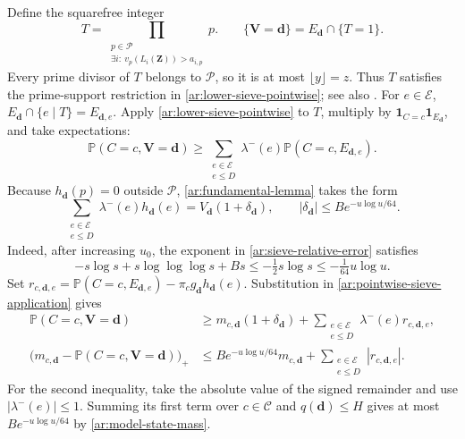 \documentclass[twoside]{aomart}
\makeatletter
\theoremstyle{paperplain}
\theoremstyle{paperdefinition}
\renewenvironment{proof}[1][\proofname]{\par\pushQED{\qed}%
  \normalfont\topsep6\p@\@plus3\p@\relax\trivlist
  \item[\hskip\labelsep\itshape #1\@addpunct{.}]\ignorespaces
}{\popQED\endtrivlist\@endpefalse}
\newcommand{\Pp}{\mathbb P}
\numberwithin{equation}{section}
\makeatother
\begin{document}
\begin{proof}
Define the squarefree integer
\begin{equation*}
 T=\prod_{\substack{p\in\mathcal P\\
          \exists i:\ v_p(L_i(\mathbf Z))>a_{i,p}}}p.
 \qquad
 \{\mathbf V=\mathbf d\}=E_{\mathbf d}\cap\{T=1\}.
 \end{equation*}
Every prime divisor of $T$ belongs to $\mathcal P$, so it is
at most $\lfloor y\rfloor=z$.
Thus $T$ satisfies the prime-support restriction in
\eqref{ar:lower-sieve-pointwise}; see also
\cite[(3.1), p.~30]{FordSieve2023}.
For $e\in\mathcal E$,
$E_{\mathbf d}\cap\{e\mid T\}=E_{\mathbf d,e}$.
Apply \eqref{ar:lower-sieve-pointwise} to $T$, multiply by
$\mathbf1_{C=c}\mathbf1_{E_{\mathbf d}}$, and take expectations:
\begin{equation}
 \Pp(C=c,\mathbf V=\mathbf d)
 \ge\sum_{\substack{e\in\mathcal E\\e\le D}}
       \lambda^-(e)\Pp(C=c,E_{\mathbf d,e}).
 \label{ar:pointwise-sieve-application}
\end{equation}
Because $h_{\mathbf d}(p)=0$ outside $\mathcal P$,
\eqref{ar:fundamental-lemma} takes the form
\begin{equation*}
 \sum_{\substack{e\in\mathcal E\\e\le D}}
       \lambda^-(e)h_{\mathbf d}(e)
 =V_{\mathbf d}(1+\delta_{\mathbf d}),\qquad
 |\delta_{\mathbf d}|\le Be^{-u\log u/64}.
 \end{equation*}
Indeed, after increasing $u_0$, the exponent in
\eqref{ar:sieve-relative-error} satisfies
\begin{equation*}
 -s\log s+s\log\log\log s+B s
 \le-\tfrac12s\log s\le-\tfrac1{64}u\log u.
 \end{equation*}
Set $r_{c,\mathbf d,e}=
\Pp(C=c,E_{\mathbf d,e})-\pi_cg_{\mathbf d}h_{\mathbf d}(e)$.
Substitution in \eqref{ar:pointwise-sieve-application} gives
\begin{equation}
 \begin{aligned}
 \Pp(C=c,\mathbf V=\mathbf d)
 &\ge m_{c,\mathbf d}(1+\delta_{\mathbf d})
       +\sum_{\substack{e\in\mathcal E\\e\le D}}\lambda^-(e)r_{c,\mathbf d,e},\\
 \bigl(m_{c,\mathbf d}-\Pp(C=c,\mathbf V=\mathbf d)\bigr)_+
 &\le Be^{-u\log u/64}m_{c,\mathbf d}
       +\sum_{\substack{e\in\mathcal E\\e\le D}}|r_{c,\mathbf d,e}|.
 \end{aligned}
 \label{ar:exact-state-deficit}
\end{equation}
For the second inequality, take the absolute value of the signed
remainder and use $|\lambda^-(e)|\le1$.
Summing its first term over $c\in\mathcal C$ and $q(\mathbf d)\le H$
gives at most
$Be^{-u\log u/64}$ by \eqref{ar:model-state-mass}.


\end{proof}
\end{document}
